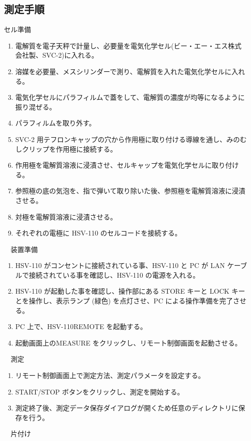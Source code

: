 \subsection{測定手順}
セル準備
\begin{enumerate}
    \item 電解質を電子天秤で計量し、必要量を電気化学セル(ビー・エー・エス株式会社製、SVC-2)に入れる。
    \item 溶媒を必要量、メスシリンダーで測り、電解質を入れた電気化学セルに入れる。
    \item 電気化学セルにパラフィルムで蓋をして、電解質の濃度が均等になるように振り混ぜる。
    \item パラフィルムを取り外す。
    \item SVC-2 用テフロンキャップの穴から作用極に取り付ける導線を通し、みのむしクリップを作用極に接続する。
    \item 作用極を電解質溶液に浸漬させ、セルキャップを電気化学セルに取り付ける。
    \item 参照極の底の気泡を、指で弾いて取り除いた後、参照極を電解質溶液に浸漬させる。
    \item 対極を電解質溶液に浸漬させる。
    \item それぞれの電極に HSV-110 のセルコードを接続する。
\end{enumerate}
　装置準備
\begin{enumerate}
    \item HSV-110 がコンセントに接続されている事、HSV-110 と PC が LAN ケーブルで接続されている事を確認し、HSV-110 の電源を入れる。
    \item HSV-110 が起動した事を確認し、操作部にある STORE キーと LOCK キーとを操作し、表示ランプ (緑色) を点灯させ、PC による操作準備を完了させる。
    \item PC 上で、HSV-110REMOTE を起動する。
    \item 起動画面上のMEASURE をクリックし、リモート制御画面を起動させる。
\end{enumerate}
　測定
\begin{enumerate}
    \item リモート制御画面上で測定方法、測定パラメータを設定する。
    \item START/STOP ボタンをクリックし、測定を開始する。
    \item 測定終了後、測定データ保存ダイアログが開くため任意のディレクトリに保存を行う。
\end{enumerate}
　片付け

